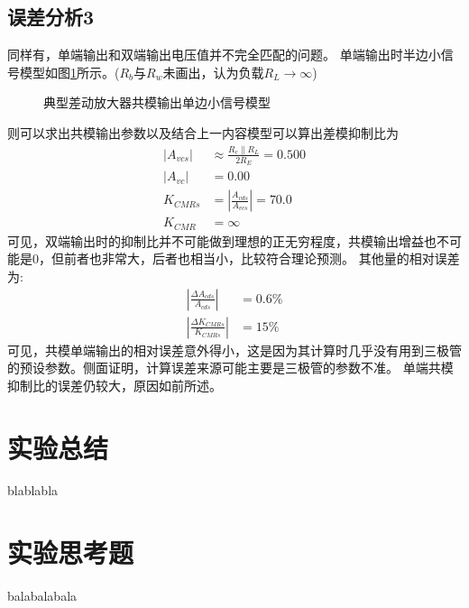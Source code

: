 \documentclass[a4paper,11pt,UTF8]{ctexart}
\begin{document}
\subsection{误差分析3}
同样有，单端输出和双端输出电压值并不完全匹配的问题。
单端输出时半边小信号模型如图\ref{fig:ncSmallSignal}所示。($R_b$与$R_w$未画出，认为负载$R_L\rightarrow\infty$)
\begin{figure}[htbp]
  \centering
  \caption{典型差动放大器共模输出单边小信号模型}
  \label{fig:ncSmallSignal}
  \end{figure}
则可以求出共模输出参数以及结合上一内容模型可以算出差模抑制比为
\begin{equation}
  \begin{aligned}
    \left | A_{vcs}\right |&\approx\frac{R_c\parallel R_L}{2R_E}=0.500\\
    \left | A_{vc}\right |&=0.00\\
    K_{CMRs}&=\left |\frac{A_{vds}}{A_{vcs}}\right |=70.0\\
    K_{CMR}&=\infty
  \end{aligned}
\end{equation}
可见，双端输出时的抑制比并不可能做到理想的正无穷程度，共模输出增益也不可能是0，但前者也非常大，后者也相当小，比较符合理论预测。
其他量的相对误差为:
\begin{equation}
  \begin{aligned}
      \left |\frac{\Delta A_{cds}}{A_{cds}}\right |&=0.6\%\\
      \left |\frac{\Delta K_{CMRs}}{K_{CMRs}}\right |&=15\%
  \end{aligned}
\end{equation}
可见，共模单端输出的相对误差意外得小，这是因为其计算时几乎没有用到三极管的预设参数。侧面证明，计算误差来源可能主要是三极管的参数不准。
单端共模抑制比的误差仍较大，原因如前所述。


\section{实验总结}
blablabla
\section{实验思考题}
balabalabala
\end{document}
